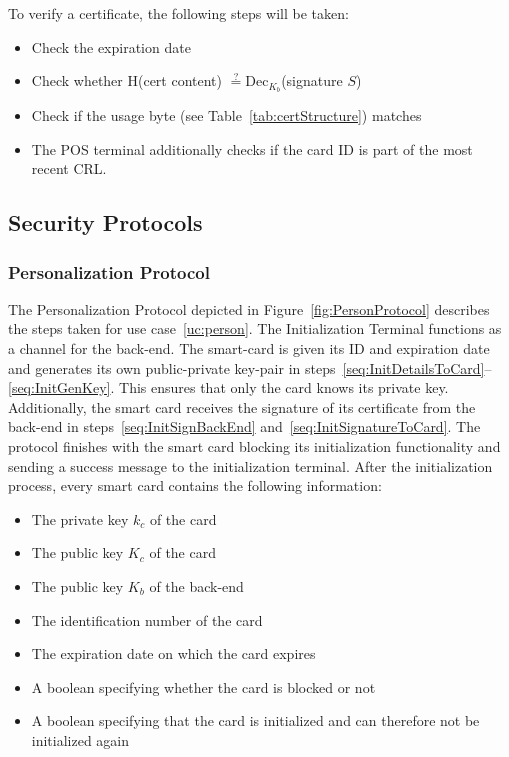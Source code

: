 To verify a certificate, the following steps will be taken:
\begin{itemize}
    \item Check the expiration date
    \item Check whether H(cert content) $\stackrel{?}{=} \textrm{Dec}_{K_b}$(signature $S$)
    \item Check if the usage byte (see Table~\ref{tab:certStructure}) matches
    \item The POS terminal additionally checks if the card ID is part of the most recent CRL\@.
\end{itemize}


\subsection{Security Protocols}

\subsubsection{Personalization Protocol} \label{sec:perProtocol}
The Personalization Protocol depicted in Figure~\ref{fig:PersonProtocol} describes the steps taken for use case~\ref{uc:person}.
The Initialization Terminal functions as a channel for the back-end. 
The smart-card is given its ID and expiration date and generates its own public-private key-pair in steps~\ref{seq:InitDetailsToCard}--\ref{seq:InitGenKey}.
This ensures that only the card knows its private key. 
Additionally, the smart card receives the signature of its certificate from the back-end in steps~\ref{seq:InitSignBackEnd} and~\ref{seq:InitSignatureToCard}.
The protocol finishes with the smart card blocking its initialization functionality and sending a success message to the initialization terminal. 
After the initialization process, every smart card contains the following information:
\begin{itemize}
    \item The private key $k_c$ of the card
    \item The public key $K_c$ of the card
    \item The public key $K_b$ of the back-end
    \item The identification number of the card
    \item The expiration date on which the card expires
    \item A boolean specifying whether the card is blocked or not
    \item A boolean specifying that the card is initialized and can therefore not be initialized again
\end{itemize}

